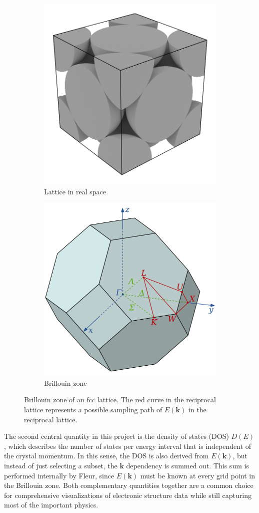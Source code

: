 \begin{figure}[htb!]
    \centering
    \begin{subfigure}{.5\textwidth}
        \centering
        \includegraphics[width=0.5\linewidth]{christian/fcc_real.png}
        \caption{Lattice in real space}
        \label{fig:fcc_real}
    \end{subfigure}%
    \begin{subfigure}{.5\textwidth}
        \centering
        \includegraphics[width=0.5\linewidth]{christian/Brillouin_Zone_(1st,_FCC).png}
        \caption{Brillouin zone}
        \label{fig:fcc_billouin}
    \end{subfigure}
    \caption[Brillouin zone of an fcc lattice]{Brillouin zone of an fcc lattice. The red curve in the reciprocal lattice represents a possible sampling path of $E(\mathbf{k})$ in the reciprocal lattice.}
    \label{fcc}
\end{figure}

The second central quantity in this project is the density of states (DOS)
$D(E)$, which describes the number of states per energy interval that is
independent of the crystal momentum. In this sense, the DOS is also derived from
$E(\mathbf{k})$, but instead of just selecting a subset, the $\mathbf{k}$
dependency is summed out. This sum is performed internally by Fleur, since
$E(\mathbf{k})$ must be known at every grid point in the Brillouin zone. Both complementary quantities together are a common choice for comprehensive visualizations of electronic structure data while still capturing most of the important physics. 

